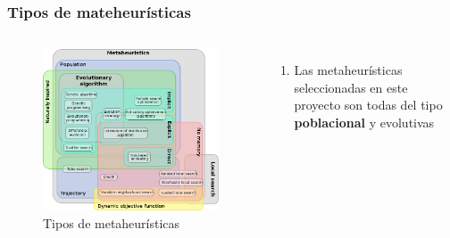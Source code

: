 \begin{frame}
  \frametitle{Tipos de mateheurísticas}
  \begin{columns}
    \begin{figure}
      \begin{center}
        \includegraphics[width=1\textwidth]{imagenes/chapter1/mh_euler_graph.png}
      \end{center}
      \caption{Tipos de metaheurísticas}
    \end{figure}
    \begin{enumerate}
      \item Las metaheurísticas seleccionadas en este proyecto son todas del tipo \textbf{poblacional} y evolutivas
    \end{enumerate}
  \end{columns}
\end{frame}

\note{

}


\note{

}